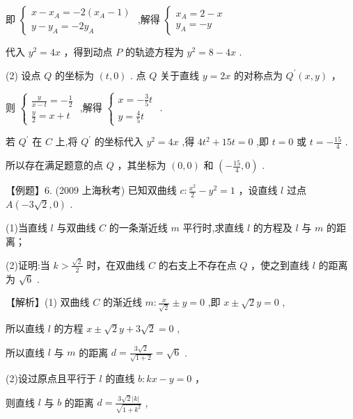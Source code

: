 \documentclass[10pt]{article}
\begin{document}
即 \(\left\{  \begin{array}{l} x - {x}_{A} =  - 2\left( {{x}_{A} - 1}\right) \\  y - {y}_{A} =  - 2{y}_{A} \end{array}\right.\) ,解得 \(\left\{  \begin{array}{l} {x}_{A} = 2 - x \\  {y}_{A} =  - y \end{array}\right.\)

代入 \({y}^{2} = {4x}\) ，得到动点 \(P\) 的轨迹方程为 \({y}^{2} = 8 - {4x}\) .

(2) 设点 \(Q\) 的坐标为 \(\left( {t,0}\right)\) . 点 \(Q\) 关于直线 \(y = {2x}\) 的对称点为 \({Q}^{\prime }\left( {x,y}\right)\) ，

则 \(\left\{  \begin{array}{l} \frac{y}{x - t} =  - \frac{1}{2} \\  \frac{y}{2} = x + t \end{array}\right.\) ,解得 \(\left\{  \begin{array}{l} x =  - \frac{3}{5}t \\  y = \frac{4}{5}t \end{array}\right.\) .

若 \({Q}^{\prime }\) 在 \(C\) 上,将 \({Q}^{\prime }\) 的坐标代入 \({y}^{2} = {4x}\) ,得 \(4{t}^{2} + {15t} = 0\) ,即 \(t = 0\) 或 \(t =  - \frac{15}{4}\) .

所以存在满足题意的点 \(Q\) ，其坐标为 \(\left( {0,0}\right)\) 和 \(\left( {-\frac{15}{4},0}\right)\) .

【例题】6. (2009 上海秋考) 已知双曲线 \(c : \frac{{x}^{2}}{2} - {y}^{2} = 1\) ，设直线 \(l\) 过点 \(A\left( {-{3\sqrt{2}},0}\right)\) .

(1)当直线 \(l\) 与双曲线 \(C\) 的一条渐近线 \(m\) 平行时,求直线 \(l\) 的方程及 \(l\) 与 \(m\) 的距离；

(2)证明:当 \(k > \frac{\sqrt{2}}{2}\) 时，在双曲线 \(C\) 的右支上不存在点 \(Q\) ，使之到直线 \(l\) 的距离为 \(\sqrt{6}\) .

【解析】(1) 双曲线 \(C\) 的渐近线 \(m : \frac{x}{\sqrt{2}} \pm  y = 0\) ,即 \(x \pm  \sqrt{2}y = 0\) ,

所以直线 \(l\) 的方程 \(x \pm  \sqrt{2}y + 3\sqrt{2} = 0\) ,

所以直线 \(l\) 与 \(m\) 的距离 \(d = \frac{3\sqrt{2}}{\sqrt{1 + 2}} = \sqrt{6}\) .

(2)设过原点且平行于 \(l\) 的直线 \(b : {kx} - y = 0\) ，

则直线 \(l\) 与 \(b\) 的距离 \(d = \frac{3\sqrt{2}\left| k\right| }{\sqrt{1 + {k}^{2}}}\) ,
\end{document}
